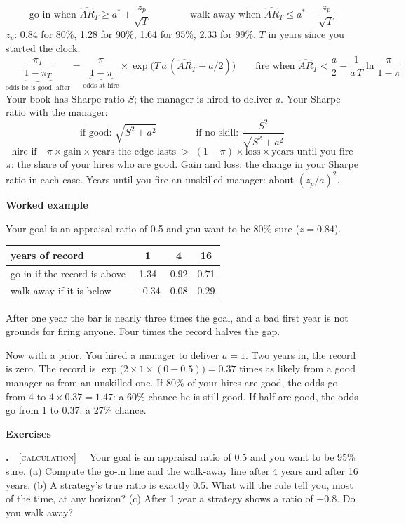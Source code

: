 \documentclass[11pt]{article}
\newcounter{ex}[section]
\renewcommand{\theex}{\thesection.\arabic{ex}}
\newenvironment{ex}[1][calculation]{\refstepcounter{ex}\par\medskip\textbf{\theex}\ \ {\small\textsc{[#1]}}\ \ }{\par}
\newcommand{\head}[1]{\par\medskip\textbf{#1}\par}
\newcommand{\AR}{\mathit{AR}}
\begin{document}
\begin{keybox}
\[ \text{go in when } \widehat{\AR}_{T} \ge a^{*} + \frac{z_{p}}{\sqrt{T}}
   \qquad\qquad \text{walk away when } \widehat{\AR}_{T} \le a^{*} - \frac{z_{p}}{\sqrt{T}} \]
{\small $z_{p}$: 0.84 for 80\%, 1.28 for 90\%, 1.64 for 95\%, 2.33 for 99\%. $T$ in years since you started the clock.}
\[ \underbrace{\frac{\pi_{T}}{1-\pi_{T}}}_{\text{odds he is good, after}} =
   \underbrace{\frac{\pi}{1-\pi}}_{\text{odds at hire}} \times \exp\!\big(T\,a\,(\widehat{\AR}_{T} - a/2)\big)
   \qquad \text{fire when } \widehat{\AR}_{T} < \frac{a}{2} - \frac{1}{a\,T}\ln\frac{\pi}{1-\pi} \]
Your book has Sharpe ratio $S$; the manager is hired to deliver $a$. Your Sharpe ratio with the manager:
\[ \text{if good: } \sqrt{S^{2} + a^{2}} \qquad\qquad \text{if no skill: } \frac{S^{2}}{\sqrt{S^{2} + a^{2}}} \]
\[ \text{hire if}\quad \pi \times \text{gain} \times \text{years the edge lasts} \;>\;
   (1-\pi) \times \text{loss} \times \text{years until you fire} \]
{\small $\pi$: the share of your hires who are good. Gain and loss: the change in your Sharpe ratio in each case. Years
until you fire an unskilled manager: about $(z_{p}/a)^{2}$.}
\end{keybox}

\head{Worked example}
Your goal is an appraisal ratio of 0.5 and you want to be 80\% sure ($z = 0.84$).
\begin{center}
\begin{tabular}{lccc}
\toprule
years of record & 1 & 4 & 16 \\
\midrule
go in if the record is above & 1.34 & 0.92 & 0.71 \\
walk away if it is below & $-0.34$ & 0.08 & 0.29 \\
\bottomrule
\end{tabular}
\end{center}
After one year the bar is nearly three times the goal, and a bad first year is not grounds for firing anyone. Four times
the record halves the gap.

Now with a prior. You hired a manager to deliver $a = 1$. Two years in, the record is zero. The record is
$\exp\big(2\times 1\times(0 - 0.5)\big) = 0.37$ times as likely from a good manager as from an unskilled one. If 80\% of
your hires are good, the odds go from 4 to $4\times 0.37 = 1.47$: a 60\% chance he is still good. If half are good, the
odds go from 1 to 0.37: a 27\% chance.

\head{Exercises}

\begin{ex}\label{ex:8.1}
Your goal is an appraisal ratio of 0.5 and you want to be 95\% sure. (a) Compute the go-in line and the walk-away line
after 4 years and after 16 years. (b) A strategy's true ratio is exactly 0.5. What will the rule tell you, most of the
time, at any horizon? (c) After 1 year a strategy shows a ratio of $-0.8$. Do you walk away?
\end{ex}
\end{document}
